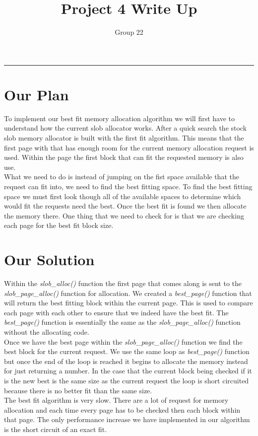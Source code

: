 \documentclass[letterpaper,10pt,notitlepage,fleqn]{article}
\title{Project 4 Write Up}
\author{Group 22}
\begin{document}
\maketitle
\hrule

\section*{Our Plan}
  To implement our best fit memory allocation algorithm we will first have to 
  understand how the current slob allocator works. After a quick search the stock 
  slob memory allocator is built with the first fit algorithm. This means that 
  the first page with that has enough room for the current memory allocation request 
  is used. Within the page the first block that can fit the requested memory is 
  also use. \\
  What we need to do is instead of jumping on the fist space available that the 
  request can fit into, we need to find the best fitting space. To find the best 
  fitting space we must first look though all of the available spaces to determine 
  which would fit the requests need the best. Once the best fit is found we then 
  allocate the memory there. One thing that we need to check for is that we are 
  checking each page for the best fit block size. 
\section*{Our Solution}
   Within the \textit{slob\_alloc()} function the first page that comes along is 
   sent to the \textit{slob\_page\_alloc()} function for allocation. We created 
   a \textit{best\_page()} function that will return the best fitting block within 
   the current page. This is used to compare each page with each other to ensure 
   that we indeed have the best fit. The \textit{best\_page()} function is essentially 
   the same as the \textit{slob\_page\_alloc()} function without the allocating 
   code.\\
   Once we have the best page within the \textit{slob\_page\_alloc()} function we 
   find the best block for the current request. We use the same loop as \textit{best\_page()} 
   function but once the end of the loop is reached it begins to allocate the memory 
   instead for just returning a number. In the case that the current block being 
   checked if it is the new best is the same size as the current request the loop 
   is short circuited because there is no better fit than the same size.\\ 
   The best fit algorithm is very slow. There are a lot of request for memory allocation 
   and each time every page has to be checked then each block within that page. 
   The only performance increase we have implemented in our algorithm is the short 
   circuit of an exact fit.
\end{document}
